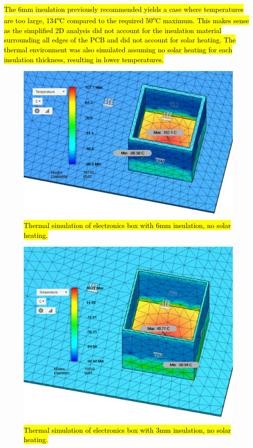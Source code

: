 \hl{The 6mm insulation previously recommended yields a case where temperatures are too large, 134\textsuperscript{o}C compared to the required 50\textsuperscript{o}C maximum. This makes sense as the simplified 2D analysis did not account for the insulation material surrounding all edges of the PCB and did not account for solar heating. The thermal environment was also simulated assuming no solar heating for each insulation thickness, resulting in lower temperatures.} \\

	\begin{figure}[H]
    \centering	
	\includegraphics[scale=0.58]{4-experiment-design/img/mechanical/6mmthicknoheat.PNG}
	\caption{\hl{Thermal simulation of electronics box with 6mm insulation, no solar heating.}}
	\label{fig:6mmthicknoheat}
    	\end{figure}

	\begin{figure}[H]
    \centering    	
    \includegraphics[scale=0.6]{4-experiment-design/img/mechanical/3mmthicknoheat.PNG}
	\caption{\hl{Thermal simulation of electronics box with 3mm insulation, no solar heating.}}
	\label{fig:3mmthicknoheat}
	\end{figure}

